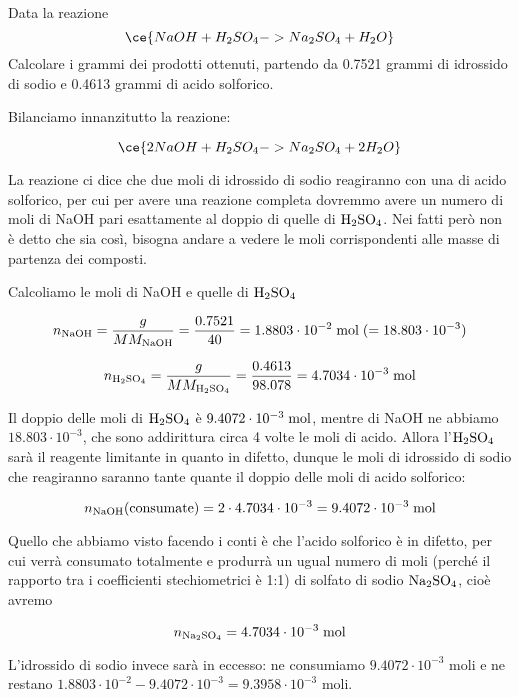 \begin{esercizio}
    Data la reazione
    \begin{equation*}
        \ce{NaOH + H_2SO_4 -> Na_2SO_4 + H_2O}
    \end{equation*}
    Calcolare i grammi dei prodotti ottenuti, partendo da 0.7521 grammi di idrossido di sodio e 0.4613 grammi di acido solforico.
\end{esercizio}
\begin{soluzione}
    Bilanciamo innanzitutto la reazione:

$$\ce{2NaOH + H_2SO_4 -> Na_2SO_4 + 2H_2O}$$

La reazione ci dice che due moli di idrossido di sodio reagiranno con una di acido solforico, per cui per avere una reazione completa dovremmo avere un numero di moli di NaOH pari esattamente al doppio di quelle di $\rm H_2SO_4$. Nei fatti però non è detto che sia così, bisogna andare a vedere le moli corrispondenti alle masse di partenza dei composti.

Calcoliamo le moli di NaOH e quelle di $\rm H_2SO_4$

$$n_{\text{NaOH}}=\frac{g}{MM_{\text{NaOH}}}=\frac{0.7521}{40}=1.8803 \cdot 10^{-2} \; \rm mol \; (=18.803 \cdot 10^{-3})$$

$$n_{\text{H}_2\text{SO}_4}=\frac{g}{MM_{\text{H}_2\text{SO}_4}}=\frac{0.4613}{98.078}=4.7034 \cdot 10^{-3} \; \rm mol$$

Il doppio delle moli di $\rm H_2SO_4$ è $9.4072 \cdot 10^{-3} \; \rm mol$, mentre di NaOH ne abbiamo $18.803 \cdot 10^{-3}$, che sono addirittura circa 4 volte le moli di acido. Allora l'$\rm H_2SO_4$ sarà il reagente limitante in quanto in difetto, dunque le moli di idrossido di sodio che reagiranno saranno tante quante il doppio delle moli di acido solforico:

$$n_{\text{NaOH}}\text{(consumate)}
=2 \cdot 4.7034 \cdot 10^{-3}
=9.4072 \cdot 10^{-3} \; \rm mol$$

Quello che abbiamo visto facendo i conti è che l'acido solforico è in difetto, per cui verrà consumato totalmente e produrrà un ugual numero di moli (perché il rapporto tra i coefficienti stechiometrici è 1:1) di solfato di sodio $\rm Na_2SO_4$, cioè avremo

$$n_{\text{Na}_2\text{SO}_4}=4.7034 \cdot 10^{-3} \; \rm mol$$

L'idrossido di sodio invece sarà in eccesso: ne consumiamo $9.4072 \cdot 10^{-3}$ moli e ne restano $1.8803 \cdot 10^{-2} - 9.4072 \cdot 10^{-3}=9.3958 \cdot 10^{-3}$ moli.


\end{soluzione}
